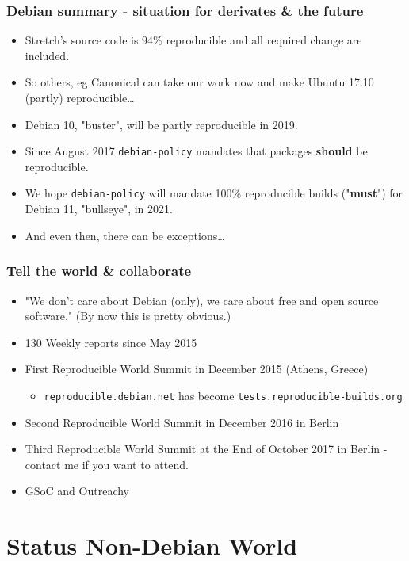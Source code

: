 \documentclass[14pt,aspectratio=169]{beamer}
\begin{document}
\begin{frame}
	\frametitle{Debian summary - situation for derivates \& the future}
 \begin{itemize}
  \item Stretch's source code is 94\% reproducible and all required change are included.
  \item So others, eg Canonical can take our work now and make Ubuntu 17.10
  (partly) reproducible…
  \item<2-4> Debian 10, "buster", will be partly reproducible in 2019.
  \item<3-4> Since August 2017 \texttt{debian-policy} mandates that packages \textbf{should} be reproducible.
  \item<4> We hope \texttt{debian-policy} will mandate 100\%
	  reproducible builds ("\textbf{must}") for Debian 11, "bullseye", in 2021.
  \item<4> And even then, there can be exceptions…
 \end{itemize}
\end{frame}

\begin{frame}
 \frametitle{Tell the world \& collaborate}

 \begin{itemize}
  \item "We don't care about Debian (only), we care about free and open
	  source software." (By now this is pretty obvious.)
  \item<2-4> 130 Weekly reports since May 2015
  \item<3-4> First Reproducible World Summit in December 2015 (Athens, Greece)
   \begin{itemize}
    \item<3-4> \texttt{reproducible.debian.net} has become \texttt{tests.reproducible-builds.org}
   \end{itemize}
    \item<3-4> Second Reproducible World Summit in December 2016 in Berlin
    \item<3-4> Third Reproducible World Summit at the End of October 2017 in Berlin - contact me if you want to attend.
   \item<4> GSoC and Outreachy
 \end{itemize}
\end{frame}



\section{Status Non-Debian World}
\end{document}
